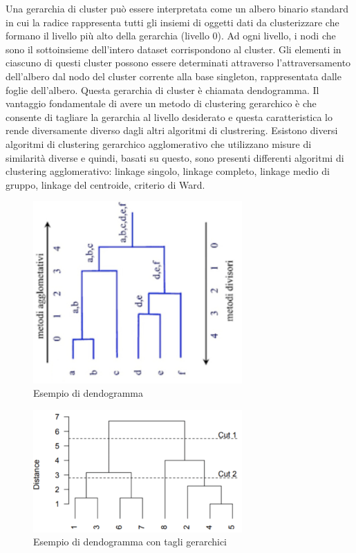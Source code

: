 \documentclass[12pt, a4paper, italian]{report}
\numberwithin{figure}{chapter}
\numberwithin{table}{chapter}
\begin{document}
Una gerarchia di cluster può essere interpretata come un albero binario standard in cui la radice rappresenta tutti gli insiemi di oggetti dati da clusterizzare che formano il livello più alto della gerarchia (livello 0). Ad ogni livello, i nodi che sono il sottoinsieme dell'intero dataset corrispondono al cluster. Gli elementi in ciascuno di questi cluster possono essere determinati attraverso l'attraversamento dell'albero dal nodo del cluster corrente alla base singleton, rappresentata dalle foglie dell'albero. Questa gerarchia di cluster è chiamata dendogramma. Il vantaggio fondamentale di avere un metodo di clustering gerarchico è che consente di tagliare la gerarchia al livello desiderato e questa caratteristica lo rende diversamente diverso dagli altri algoritmi di clustrering. Esistono diversi algoritmi di clustering gerarchico agglomerativo che utilizzano misure di similarità diverse e quindi, basati su questo, sono presenti differenti algoritmi di clustering agglomerativo: linkage singolo, linkage completo, linkage medio di gruppo, linkage del centroide, criterio di Ward.

\begin{figure}[h] \centering
\includegraphics[width=8cm]{C_Gerarchico1.png}
\caption{Esempio di dendogramma\protect\footnotemark}
\label{fig:qualcosa}
\end{figure}

\vspace{1cm}

\begin{figure}[h] \centering
\includegraphics[width=8cm]{C_Gerarchico2.png}
\caption{Esempio di dendogramma con tagli gerarchici\protect\footnotemark}
\label{fig:qualcosa}
\end{figure}
\end{document}
